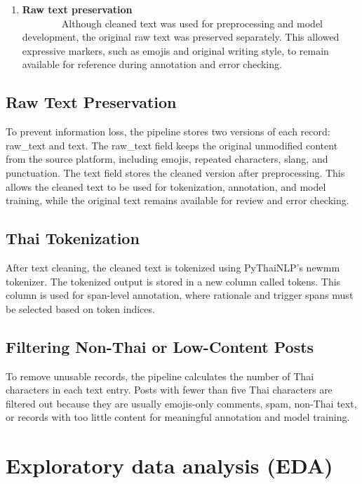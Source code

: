 \documentclass[12pt,oneside,openright,a4paper]{cpe-english-project}
\begin{document}
\begin{enumerate}
\item
  {\textbf{Raw text preservation}\\
  ~~~~~~~~Although cleaned text was used for preprocessing and model development, the original raw text was preserved separately. This allowed expressive markers, such as emojis and original writing style, to remain available for reference during annotation and error checking.}
\end{enumerate}

\subsection{Raw Text Preservation}

To prevent information loss, the pipeline stores two versions of each record: raw\_text and text. The raw\_text field keeps the original unmodified content from the source platform, including emojis, repeated characters, slang, and punctuation. The text field stores the cleaned version after preprocessing. This allows the cleaned text to be used for tokenization, annotation, and model training, while the original text remains available for review and error checking.

\subsection{Thai Tokenization}

After text cleaning, the cleaned text is tokenized using PyThaiNLP's newmm tokenizer. The tokenized output is stored in a new column called tokens. This column is used for span-level annotation, where rationale and trigger spans must be selected based on token indices.

\subsection{Filtering Non-Thai or Low-Content Posts}

To remove unusable records, the pipeline calculates the number of Thai characters in each text entry. Posts with fewer than five Thai characters are filtered out because they are usually emojis-only comments, spam, non-Thai text, or records with too little content for meaningful annotation and model training.

\section{Exploratory data analysis (EDA)}
\end{document}
